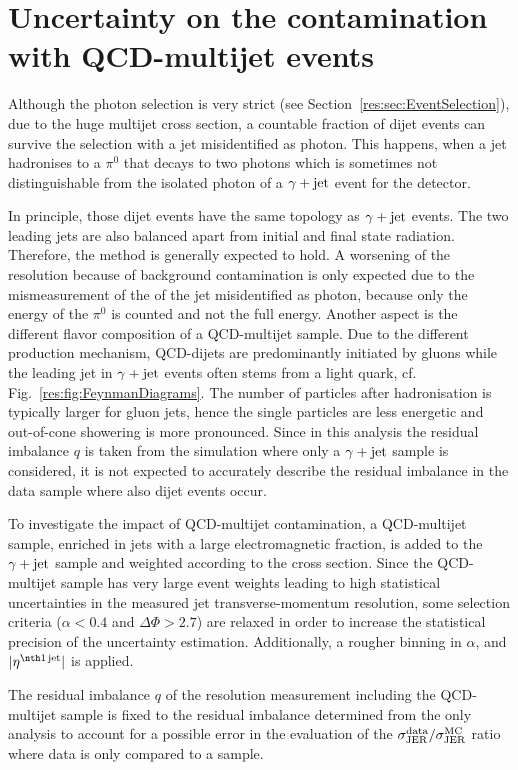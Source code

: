 \section*{Uncertainty on the contamination with QCD-multijet events}
Although the photon selection is very strict (see Section~\ref{res:sec:EventSelection}), 
due to the huge multijet cross section, a countable fraction of dijet events can survive the selection with a jet misidentified as photon.
This happens, when \eg a jet hadronises to a $\pi^0$ that decays to two photons which is sometimes not distinguishable from the isolated photon of a $\gamma + \text{jet}$ event for the detector.

In principle, those dijet events have the same topology as $\gamma + \text{jet}$ events. The two leading jets are also balanced apart from initial and final state radiation. 
Therefore, the method is generally expected to hold. 
A worsening of the resolution because of background contamination is only expected due to the mismeasurement of the \pt of the jet misidentified as photon, because only the energy of the $\pi^0$ is counted and not the full energy.
Another aspect is the different flavor composition of a QCD-multijet sample. 
Due to the different production mechanism, QCD-dijets are predominantly initiated by gluons while the leading jet in $\gamma + \text{jet}$ events often stems from a light quark, cf. Fig.~\ref{res:fig:FeynmanDiagrams}.
The number of particles after hadronisation is typically larger for gluon jets, hence the single particles are less energetic and out-of-cone showering is more pronounced.
Since in this analysis the residual imbalance $q$ is taken from the simulation where only a $\gamma + \text{jet}$ sample is considered, it is not expected to accurately describe the residual imbalance in the data sample where also dijet events occur.

To investigate the impact of QCD-multijet contamination, a QCD-multijet sample, enriched in jets with a large electromagnetic fraction, is added to the $\gamma + \text{jet}$ sample and weighted according to the cross section.
Since the QCD-multijet sample has very large event weights leading to high statistical uncertainties in the measured jet transverse-momentum resolution, some selection criteria ($\alpha<0.4$ and $\Delta\Phi>2.7$) are relaxed in order to increase the statistical precision of the uncertainty estimation.
Additionally, a rougher binning in $\alpha$, \ptgamma and $|\etafirstjet|$ is applied.

The residual imbalance $q$ of the resolution measurement including the QCD-multijet sample is fixed to the residual imbalance determined from the \GAMJET only analysis to account for a possible error in the evaluation of the $\sigma_\mathrm{JER}^{\text{data}}/\sigma_\mathrm{JER}^{\text{MC}}$ ratio where data is only compared to a \GAMJET sample.

